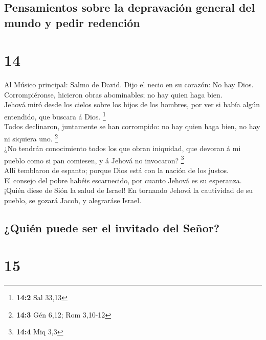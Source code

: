 \hypertarget{pensamientos-sobre-la-depravaciuxf3n-general-del-mundo-y-pedir-redenciuxf3n}{%
\subsection{Pensamientos sobre la depravación general del mundo y pedir
redención}\label{pensamientos-sobre-la-depravaciuxf3n-general-del-mundo-y-pedir-redenciuxf3n}}

\hypertarget{section-13}{%
\section{14}\label{section-13}}

 Al Músico principal: Salmo de David. Dijo el necio en su
corazón: No hay Dios. Corrompiéronse, hicieron obras abominables; no hay
quien haga bien.\\
 Jehová miró desde los cielos sobre los hijos de los
hombres, por ver si había algún entendido, que buscara á Dios.
\footnote{\textbf{14:2} Sal 33,13}\\
 Todos declinaron, juntamente se han corrompido: no hay
quien haga bien, no hay ni siquiera uno. \footnote{\textbf{14:3} Gén
  6,12; Rom 3,10-12}\\
 ¿No tendrán conocimiento todos los que obran iniquidad,
que devoran á mi pueblo como si pan comiesen, y á Jehová no invocaron?
\footnote{\textbf{14:4} Miq 3,3}\\
 Allí temblaron de espanto; porque Dios está con la nación
de los justos.\\
 El consejo del pobre habéis escarnecido, por cuanto
Jehová es su esperanza.\\
 ¡Quién diese de Sión la salud de Israel! En tornando
Jehová la cautividad de su pueblo, se gozará Jacob, y alegraráse Israel.

\hypertarget{quiuxe9n-puede-ser-el-invitado-del-seuxf1or}{%
\subsection{¿Quién puede ser el invitado del
Señor?}\label{quiuxe9n-puede-ser-el-invitado-del-seuxf1or}}

\hypertarget{section-14}{%
\section{15}\label{section-14}}

